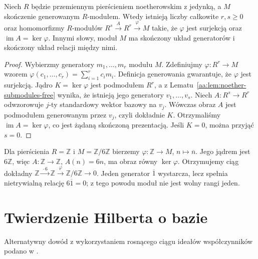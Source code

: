 \begin{twierdzenie}
\label{aa:tw:noether-finite-presentation}
Niech $R$ będzie przemiennym pierścieniem noetherowskim
z jedynką, a $M$ skończenie generowanym $R$-modułem.
Wtedy istnieją liczby całkowite $r,s\geq0$ oraz
homomorfizmy $R$-modułów
$R^s\xrightarrow{\,A\,}R^r\xrightarrow{\,\varphi\,}M$
takie, że $\varphi$ jest surjekcją oraz
$\operatorname{im} A=\ker\varphi$.
Innymi słowy, moduł $M$ ma skończony układ generatorów
i skończony układ relacji między nimi.
\end{twierdzenie}
\begin{proof}
Wybierzmy generatory $m_1,\ldots,m_r$ modułu $M$.
Zdefiniujmy $\varphi:R^r\to M$ wzorem
$\varphi(c_1,\ldots,c_r)=\sum_{i=1}^r c_i m_i$.
Definicja generowania gwarantuje, że $\varphi$ jest
surjekcją. Jądro $K=\ker\varphi$ jest podmodułem
$R^r$, a z Lematu~\ref{aa:lem:noether-submodules-free}
wynika, że istnieją jego generatory $v_1,\ldots,v_s$.
Niech $A:R^s\to R^r$ odwzorowuje $j$-ty standardowy
wektor bazowy na $v_j$. Wówczas obraz $A$ jest
podmodułem generowanym przez $v_j$, czyli dokładnie
$K$. Otrzymaliśmy $\operatorname{im}A=\ker\varphi$,
co jest żądaną skończoną prezentacją.
Jeśli $K=0$, można przyjąć $s=0$.
\end{proof}

\begin{przyklad}
\label{aa:prz:noether-finite-presentation-z6}
Dla pierścienia $R=\mathbb Z$ i $M=\mathbb Z/6\mathbb Z$
bierzemy $\varphi:\mathbb Z\to M$, $n\mapsto\overline n$.
Jego jądrem jest $6\mathbb Z$, więc
$A:\mathbb Z\to\mathbb Z$, $A(n)=6n$, ma obraz
równy $\ker\varphi$. Otrzymujemy ciąg dokładny
$\mathbb Z\xrightarrow{\,\cdot6\,}\mathbb Z
\xrightarrow{\,\varphi\,}\mathbb Z/6\mathbb Z\to0$.
Jeden generator $\overline1$ wystarcza, lecz spełnia
nietrywialną relację $6\overline1=0$; z tego powodu
moduł nie jest wolny rangi jeden.
\end{przyklad}

\section{Twierdzenie Hilberta o bazie}
Alternatywny dowód z wykorzystaniem rosnącego ciągu ideałów współczynników podano w .

